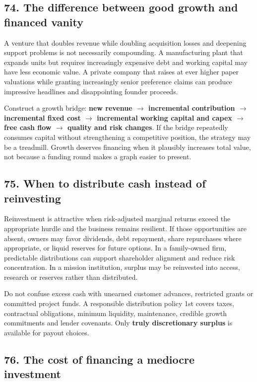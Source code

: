 \subsection{74. The difference between good growth and financed vanity}


A venture that doubles revenue while doubling acquisition losses and deepening support problems is not necessarily compounding. A manufacturing plant that expands units but requires increasingly expensive debt and working capital may have less economic value. A private company that raises at ever higher paper valuations while granting increasingly senior preference claims can produce impressive headlines and disappointing founder proceeds.

Construct a growth bridge: \textbf{new revenue $\to$ incremental contribution $\to$ incremental fixed cost $\to$ incremental working capital and capex $\to$ free cash flow $\to$ quality and risk changes}. If the bridge repeatedly consumes capital without strengthening a competitive position, the strategy may be a treadmill. Growth deserves financing when it plausibly increases total value, not because a funding round makes a graph easier to present.

\subsection{75. When to distribute cash instead of reinvesting}


Reinvestment is attractive when risk-adjusted marginal returns exceed the appropriate hurdle and the business remains resilient. If those opportunities are absent, owners may favor dividends, debt repayment, share repurchases where appropriate, or liquid reserves for future options. In a family-owned firm, predictable distributions can support shareholder alignment and reduce risk concentration. In a mission institution, surplus may be reinvested into access, research or reserves rather than distributed.

Do not confuse excess cash with unearned customer advances, restricted grants or committed project funds. A responsible distribution policy 1st covers taxes, contractual obligations, minimum liquidity, maintenance, credible growth commitments and lender covenants. Only \textbf{truly discretionary surplus} is available for payout choices.

\subsection{76. The cost of financing a mediocre investment}


